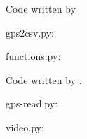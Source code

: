 \label{ax:python}

Code written by \textcite{Pereira2020}

gps2csv.py:


functions.py:


Code written by \textcite{Borguezani2020}.

gps-read.py:


video.py:
